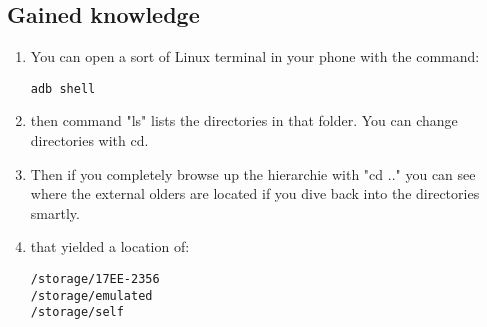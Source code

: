 \subsection{Gained knowledge}
\begin{enumerate}
    \item You can open a sort of Linux terminal in your phone with the command:
\begin{verbatim}
adb shell
\end{verbatim}
    \item then command "ls" lists the directories in that folder. You can change directories with cd.
    \item Then if you completely browse up the hierarchie with "cd .." you can see where the external olders are located if you dive back into the directories smartly.
    \item that yielded a location of: 
\begin{verbatim}
/storage/17EE-2356
/storage/emulated
/storage/self
\end{verbatim}
    
\end{enumerate}